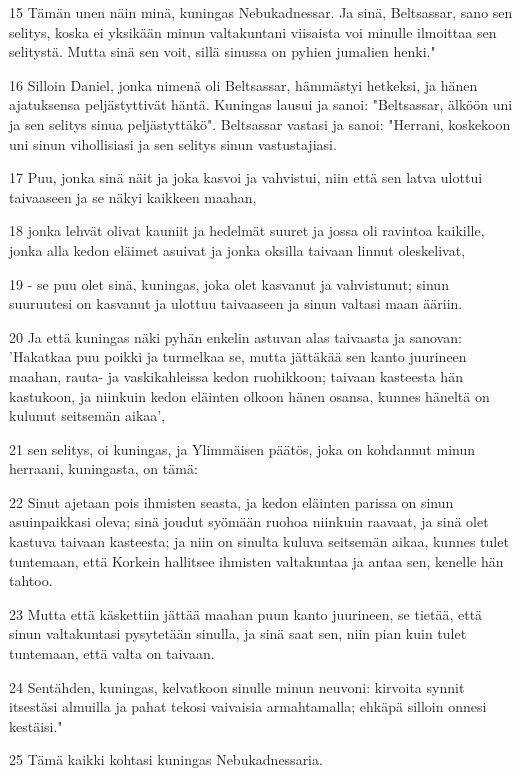 \par 15 Tämän unen näin minä, kuningas Nebukadnessar. Ja sinä, Beltsassar, sano sen selitys, koska ei yksikään minun valtakuntani viisaista voi minulle ilmoittaa sen selitystä. Mutta sinä sen voit, sillä sinussa on pyhien jumalien henki."
\par 16 Silloin Daniel, jonka nimenä oli Beltsassar, hämmästyi hetkeksi, ja hänen ajatuksensa peljästyttivät häntä. Kuningas lausui ja sanoi: "Beltsassar, älköön uni ja sen selitys sinua peljästyttäkö". Beltsassar vastasi ja sanoi: "Herrani, koskekoon uni sinun vihollisiasi ja sen selitys sinun vastustajiasi.
\par 17 Puu, jonka sinä näit ja joka kasvoi ja vahvistui, niin että sen latva ulottui taivaaseen ja se näkyi kaikkeen maahan,
\par 18 jonka lehvät olivat kauniit ja hedelmät suuret ja jossa oli ravintoa kaikille, jonka alla kedon eläimet asuivat ja jonka oksilla taivaan linnut oleskelivat,
\par 19 - se puu olet sinä, kuningas, joka olet kasvanut ja vahvistunut; sinun suuruutesi on kasvanut ja ulottuu taivaaseen ja sinun valtasi maan ääriin.
\par 20 Ja että kuningas näki pyhän enkelin astuvan alas taivaasta ja sanovan: 'Hakatkaa puu poikki ja turmelkaa se, mutta jättäkää sen kanto juurineen maahan, rauta- ja vaskikahleissa kedon ruohikkoon; taivaan kasteesta hän kastukoon, ja niinkuin kedon eläinten olkoon hänen osansa, kunnes häneltä on kulunut seitsemän aikaa',
\par 21 sen selitys, oi kuningas, ja Ylimmäisen päätös, joka on kohdannut minun herraani, kuningasta, on tämä:
\par 22 Sinut ajetaan pois ihmisten seasta, ja kedon eläinten parissa on sinun asuinpaikkasi oleva; sinä joudut syömään ruohoa niinkuin raavaat, ja sinä olet kastuva taivaan kasteesta; ja niin on sinulta kuluva seitsemän aikaa, kunnes tulet tuntemaan, että Korkein hallitsee ihmisten valtakuntaa ja antaa sen, kenelle hän tahtoo.
\par 23 Mutta että käskettiin jättää maahan puun kanto juurineen, se tietää, että sinun valtakuntasi pysytetään sinulla, ja sinä saat sen, niin pian kuin tulet tuntemaan, että valta on taivaan.
\par 24 Sentähden, kuningas, kelvatkoon sinulle minun neuvoni: kirvoita synnit itsestäsi almuilla ja pahat tekosi vaivaisia armahtamalla; ehkäpä silloin onnesi kestäisi."
\par 25 Tämä kaikki kohtasi kuningas Nebukadnessaria.
